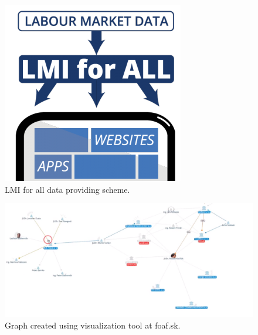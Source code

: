\documentclass[thesis=B,english]{sprlajur-slovakopendata}[2018/05/12]
\begin{document}
{	\begin{figure}[H]
		\centering
		\includegraphics[scale=0.5]{pictures/LMIForAll.png}
		\caption{LMI for all data providing scheme. \cite{lmiforall}}
		\label{fig:LMI for all}
	\end{figure}
	
	\begin{figure}[H]
		\includegraphics[width=\linewidth]{pictures/foafskgraph.png}
		\caption{Graph created using visualization tool at foaf.sk.}
		\label{fig:foafGraph}
	\end{figure}
	
}
\end{document}
